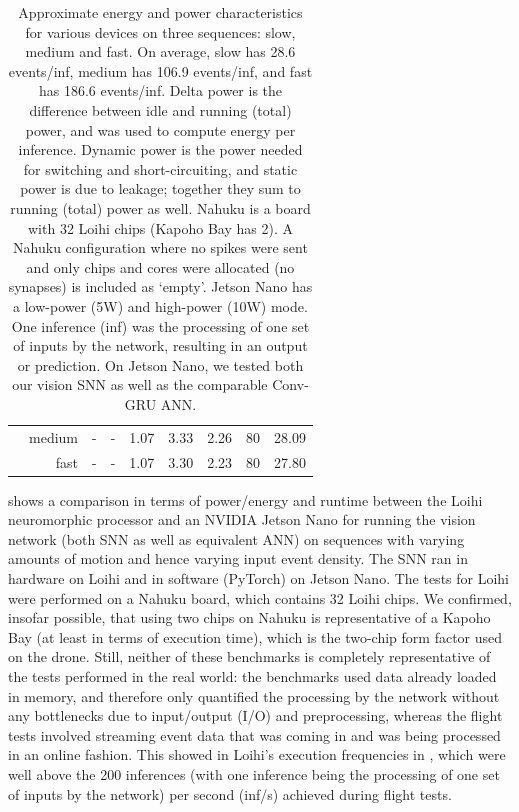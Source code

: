 \begin{table}[!t]
{\begin{tabular}{lrrrrrrrr}
			& medium & -          & -           &  1.07   & 3.33       & 2.26     & 80     & 28.09 \\
			& fast   & -          & -           &  1.07   & 3.30       & 2.23     & 80     & 27.80 \\ 
			\bottomrule
		\end{tabular}
	}
    \caption{Approximate energy and power characteristics for various devices on three sequences: slow, medium and fast. On average, slow has 28.6 events/inf, medium has 106.9 events/inf, and fast has 186.6 events/inf. Delta power is the difference between idle and running (total) power, and was used to compute energy per inference. Dynamic power is the power needed for switching and short-circuiting, and static power is due to leakage; together they sum to running (total) power as well. Nahuku is a board with 32 Loihi chips (Kapoho Bay has 2). A Nahuku configuration where no spikes were sent and only chips and cores were allocated (no synapses) is included as `empty'. Jetson Nano has a low-power (5W) and high-power (10W) mode. One inference (inf) was the processing of one set of inputs by the network, resulting in an output or prediction. On Jetson Nano, we tested both our vision SNN as well as the comparable Conv-GRU ANN.}
	\label{tab:sr_energy}
\end{table}

 shows a comparison in terms of power/energy and runtime between the Loihi neuromorphic processor and an NVIDIA Jetson Nano for running the vision network (both SNN as well as equivalent ANN) on sequences with varying amounts of motion and hence varying input event density. The SNN ran in hardware on Loihi and in software (PyTorch) on Jetson Nano. The tests for Loihi were performed on a Nahuku board, which contains 32 Loihi chips. We confirmed, insofar possible, that using two chips on Nahuku is representative of a Kapoho Bay (at least in terms of execution time), which is the two-chip form factor used on the drone. Still, neither of these benchmarks is completely representative of the tests performed in the real world: the benchmarks used data already loaded in memory, and therefore only quantified the processing by the network without any bottlenecks due to input/output (I/O) and preprocessing, whereas the flight tests involved streaming event data that was coming in and was being processed in an online fashion. This showed in Loihi's execution frequencies in , which were well above the 200 inferences (with one inference being the processing of one set of inputs by the network) per second (inf/s) achieved during flight tests.

